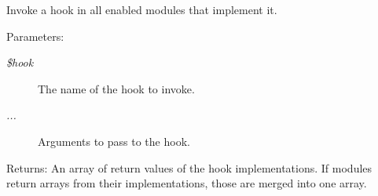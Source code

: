 Invoke a hook in all enabled modules that implement it.

\begin{Desc}
\item[Parameters:]
\begin{description}
\item[{\em \$hook}]The name of the hook to invoke. \item[{\em ...}]Arguments to pass to the hook. \end{description}
\end{Desc}
\begin{Desc}
\item[Returns:]An array of return values of the hook implementations. If modules return arrays from their implementations, those are merged into one array. \end{Desc}

